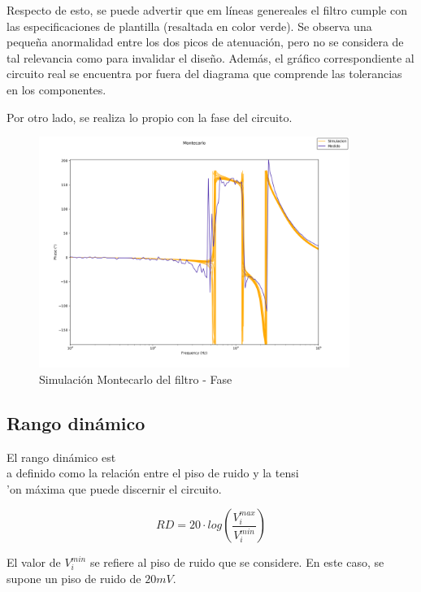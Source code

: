 Respecto de esto, se puede advertir que em l\'ineas genereales el filtro cumple con las especificaciones de plantilla (resaltada en color verde). Se observa una peque\~na anormalidad entre los dos picos de atenuaci\'on, pero no se considera de tal relevancia como para invalidar el dise\~no. Adem\'as, el gr\'afico correspondiente al circuito real se encuentra por fuera del diagrama que comprende las tolerancias en los componentes.

Por otro lado, se realiza lo propio con la fase del circuito.

\begin{figure}[H]
    \centering
    \includegraphics[width=0.9\textwidth]{../EJ3/Resources/montecarlo_phase.png}
    \caption{Simulaci\'on Montecarlo del filtro - Fase}
     \label{EJ3_FILTER_MONTECARLO_PHASE}
\end{figure}

\subsection{Rango din\'amico}

El rango din\'amico est\\a definido como la relaci\'on entre el piso de ruido y la tensi\\'on m\'axima que puede discernir el circuito.

\begin{equation}
\label{EJ3_RD}
RD = 20 \cdot log \left( \frac{V_i^{max}}{V_i^{min}}\right)
\end{equation}

El valor de $V_i^{min}$ se refiere al piso de ruido que se considere. En este caso, se supone un piso de ruido de $20mV$.

